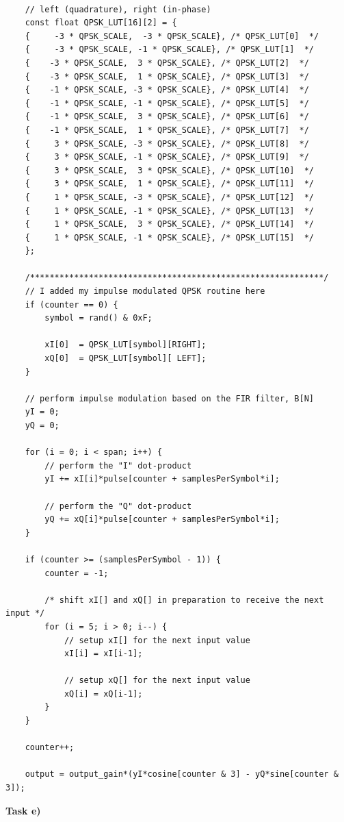 \documentclass{article}
\begin{document}
\begin{verbatim}

	// left (quadrature), right (in-phase)
	const float QPSK_LUT[16][2] = {
	{     -3 * QPSK_SCALE,  -3 * QPSK_SCALE}, /* QPSK_LUT[0]  */
	{     -3 * QPSK_SCALE, -1 * QPSK_SCALE}, /* QPSK_LUT[1]  */
	{    -3 * QPSK_SCALE,  3 * QPSK_SCALE}, /* QPSK_LUT[2]  */
	{    -3 * QPSK_SCALE,  1 * QPSK_SCALE}, /* QPSK_LUT[3]  */
	{    -1 * QPSK_SCALE, -3 * QPSK_SCALE}, /* QPSK_LUT[4]  */
	{    -1 * QPSK_SCALE, -1 * QPSK_SCALE}, /* QPSK_LUT[5]  */
	{    -1 * QPSK_SCALE,  3 * QPSK_SCALE}, /* QPSK_LUT[6]  */
	{    -1 * QPSK_SCALE,  1 * QPSK_SCALE}, /* QPSK_LUT[7]  */
	{     3 * QPSK_SCALE, -3 * QPSK_SCALE}, /* QPSK_LUT[8]  */
	{     3 * QPSK_SCALE, -1 * QPSK_SCALE}, /* QPSK_LUT[9]  */
	{     3 * QPSK_SCALE,  3 * QPSK_SCALE}, /* QPSK_LUT[10]  */
	{     3 * QPSK_SCALE,  1 * QPSK_SCALE}, /* QPSK_LUT[11]  */
	{     1 * QPSK_SCALE, -3 * QPSK_SCALE}, /* QPSK_LUT[12]  */
	{     1 * QPSK_SCALE, -1 * QPSK_SCALE}, /* QPSK_LUT[13]  */
	{     1 * QPSK_SCALE,  3 * QPSK_SCALE}, /* QPSK_LUT[14]  */
	{     1 * QPSK_SCALE, -1 * QPSK_SCALE}, /* QPSK_LUT[15]  */
	};

	/************************************************************/
	// I added my impulse modulated QPSK routine here
	if (counter == 0) {
		symbol = rand() & 0xF;

		xI[0]  = QPSK_LUT[symbol][RIGHT];  
		xQ[0]  = QPSK_LUT[symbol][ LEFT];   
	}

	// perform impulse modulation based on the FIR filter, B[N]
	yI = 0;
	yQ = 0;

	for (i = 0; i < span; i++) {
		// perform the "I" dot-product
		yI += xI[i]*pulse[counter + samplesPerSymbol*i];	

		// perform the "Q" dot-product
		yQ += xQ[i]*pulse[counter + samplesPerSymbol*i];	
	}

	if (counter >= (samplesPerSymbol - 1)) {
		counter = -1; 

		/* shift xI[] and xQ[] in preparation to receive the next input */
		for (i = 5; i > 0; i--) {
			// setup xI[] for the next input value
			xI[i] = xI[i-1];  

			// setup xQ[] for the next input value
			xQ[i] = xQ[i-1];  
		}
	}

	counter++;

	output = output_gain*(yI*cosine[counter & 3] - yQ*sine[counter & 3]);
\end{verbatim}

\pagebreak
\textbf{Task e)}
\end{document}
